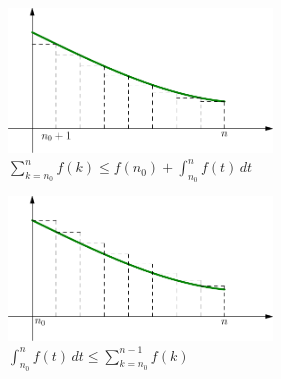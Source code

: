 \begin{figure}[ht]
    \centering
    \includegraphics[width=7cm]{./C9650_1.pdf}
    \caption{$\sum_{k=n_0}^{n}f(k) \leq f(n_0) +\int_{n_0}^nf(t)\,dt$}
    \label{fig:C9650_1}
\end{figure}

\begin{figure}[ht]
    \centering
    \includegraphics[width=7cm]{./C9650_2.pdf}
    \caption{$\int_{n_0}^nf(t)\,dt \leq \sum_{k=n_0}^{n-1}f(k)$}
    \label{fig:C9650_2}
\end{figure}

